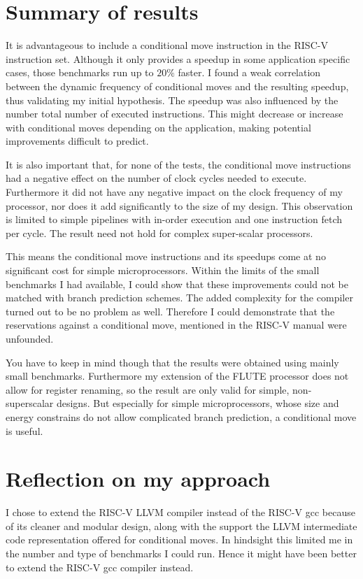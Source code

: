 \documentclass[12pt,twoside,notitlepage]{report}
\begin{document}
\section{Summary of results}
It is advantageous to include a conditional move instruction in the RISC-V instruction set. Although it only provides a speedup in some application specific cases, those benchmarks run up to $20\%$ faster. I found a weak correlation between the dynamic frequency of conditional moves and the resulting speedup, thus validating my initial hypothesis. The speedup was also influenced by the number total number of executed instructions. This might decrease or increase with conditional moves depending on the application, making potential improvements difficult to predict.

It is also important that, for none of the tests, the conditional move instructions had a negative effect on the number of clock cycles needed to execute. Furthermore it did not have any negative impact on the clock frequency of my processor, nor does it add significantly to the size of my design. This observation is limited to simple pipelines with in-order execution and one instruction fetch per cycle. The result need not hold for complex super-scalar processors.

This means the conditional move instructions and its speedups come at no significant cost for simple microprocessors. Within the limits of the small benchmarks I had available, I could show that these improvements could not be matched with branch prediction schemes. The added complexity for the compiler turned out to be no problem as well. Therefore I could demonstrate that the reservations against a conditional move, mentioned in the RISC-V manual were unfounded. 

You have to keep in mind though that the results were obtained using mainly small benchmarks. Furthermore my extension of the FLUTE processor does not allow for register renaming, so the result are only valid for simple, non-superscalar designs.
But especially for simple microprocessors, whose size and energy constrains do not allow complicated branch prediction, a conditional move is useful.


\section{Reflection on my approach}

I chose to extend the RISC-V LLVM compiler instead of the RISC-V gcc because of its cleaner and modular design, along with the support the LLVM intermediate code representation offered for conditional moves. In hindsight this limited me in the number and type of benchmarks I could run. Hence it might have been better to extend the RISC-V gcc compiler instead. 
\end{document}

